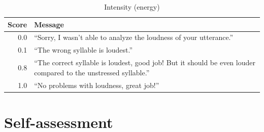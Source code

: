\begin{table}[p]
			\vspace{1.5em}
			
			\begin{subtable}{\textwidth}
				\centering
				\caption{Intensity (energy)}
				\begin{tabularx}{\textwidth}{rX}
					\toprule
					Score & Message \\
					\midrule 
					 0.0 & ``Sorry, I wasn't able to analyze the loudness of your utterance.'' \\
					 0.1 & ``The wrong syllable is loudest.'' \\
					0.8 & ``The correct syllable is loudest, good job! But it should be even louder compared to the unstressed syllable.'' \\
					1.0 & ``No problems with loudness, great job!'' \\
					\bottomrule
				\end{tabularx}
				\label{tab:explicit:messages:int}
			\end{subtable}	
			
			\label{tab:explicit:messages}
		\end{table}
		
		
		
	
		\section{Self-assessment}
		\label{sec:other:selfassess}
		
		

